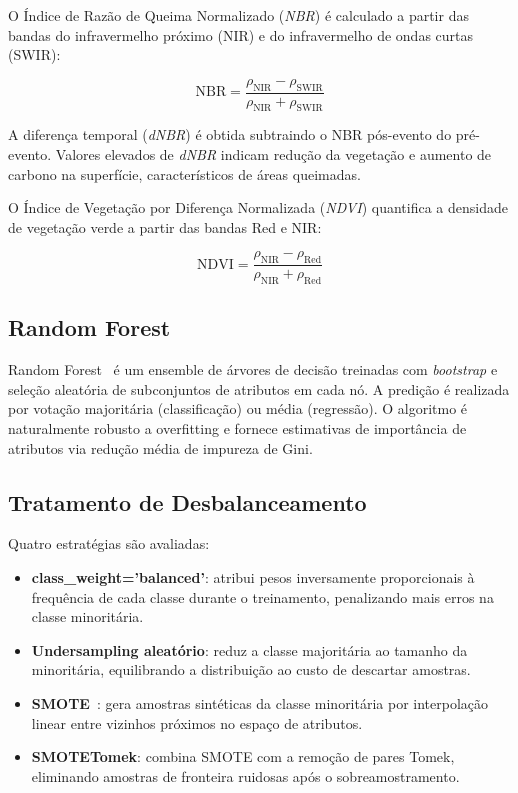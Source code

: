 \documentclass[conference]{IEEEtran}
\begin{document}
O Índice de Razão de Queima Normalizado (\textit{NBR}) é calculado a partir das
bandas do infravermelho próximo (NIR) e do infravermelho de ondas curtas (SWIR):

\begin{equation}
  \mathrm{NBR} = \frac{\rho_{\mathrm{NIR}} - \rho_{\mathrm{SWIR}}}
                      {\rho_{\mathrm{NIR}} + \rho_{\mathrm{SWIR}}}
  \label{eq:nbr}
\end{equation}

A diferença temporal (\textit{dNBR}) é obtida subtraindo o NBR pós-evento do
pré-evento. Valores elevados de \textit{dNBR} indicam redução da vegetação e
aumento de carbono na superfície, característicos de áreas queimadas.

O Índice de Vegetação por Diferença Normalizada (\textit{NDVI}) quantifica a
densidade de vegetação verde a partir das bandas Red e NIR:

\begin{equation}
  \mathrm{NDVI} = \frac{\rho_{\mathrm{NIR}} - \rho_{\mathrm{Red}}}
                       {\rho_{\mathrm{NIR}} + \rho_{\mathrm{Red}}}
  \label{eq:ndvi}
\end{equation}

\subsection{Random Forest}

Random Forest~\cite{b3} é um ensemble de árvores de decisão treinadas com
\textit{bootstrap} e seleção aleatória de subconjuntos de atributos em cada
nó. A predição é realizada por votação majoritária (classificação) ou média
(regressão). O algoritmo é naturalmente robusto a overfitting e fornece
estimativas de importância de atributos via redução média de impureza de Gini.

\subsection{Tratamento de Desbalanceamento}

Quatro estratégias são avaliadas:

\begin{itemize}
  \item \textbf{class\_weight='balanced'}: atribui pesos inversamente
        proporcionais à frequência de cada classe durante o treinamento,
        penalizando mais erros na classe minoritária.
  \item \textbf{Undersampling aleatório}: reduz a classe majoritária ao
        tamanho da minoritária, equilibrando a distribuição ao custo de
        descartar amostras.
  \item \textbf{SMOTE}~\cite{b5}: gera amostras sintéticas da classe
        minoritária por interpolação linear entre vizinhos próximos no
        espaço de atributos.
  \item \textbf{SMOTETomek}: combina SMOTE com a remoção de pares Tomek,
        eliminando amostras de fronteira ruidosas após o
        sobreamostramento.
\end{itemize}
\end{document}
